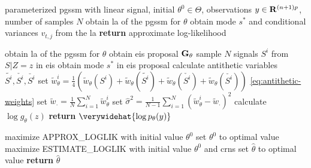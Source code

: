 \begin{algorithm}
    \begin{algorithmic}[1]
        \Require parameterized \gls{pgssm} with linear signal, initial $\theta^{0} \in \Theta$, observations $y \in \mathbf R^{(n+1)p}$, number of samples $N$
            \State obtain \gls{la} of the \gls{pgssm} for $\theta$ 
            \State obtain mode $s^{\ast}$ and conditional variances $v_{t,j}$ from the \gls{la} 
            \State \textbf{return} approximate log-likelihood 
        \EndFunction 
        \Statex

            \State obtain \gls{la} of the \gls{pgssm} for $\theta$ 
            \State obtain \gls{eis} proposal $\mathbf G_{\theta}$ 
            \State sample $N$ signals $S^{i}$ from $S|Z = z$ in \gls{eis} 
            \State obtain mode $s^{\ast}$ in \gls{eis} proposal 
            \State calculate antithetic variables $\tilde{S^{i}},\check{S^{i}}, \breve{{S^{i}}}$ \Comment{\eqref{eq:antithetic-location}, \eqref{eq:antithetic-scale} \& \eqref{eq:antithetic-scale-location}}
            \State set $\tilde w_{\theta}^i = \frac{1}{4} \left( \tilde w_{\theta} (S^{i}) + \tilde w_{\theta}(\tilde{S^{i}}) + \tilde w_{\theta}(\check{S^{i}}) + \tilde w_{\theta}(\breve{{S^{i}}}) \right)$ \eqref{eq:antithetic-weights}
            \State set $\tilde w_{\cdot} = \frac{1}{N}\sum_{i = 1}^N \tilde w^{i}_{\theta}$
            \State set $\hat \sigma^{2} = \frac{1}{N - 1} \sum_{i = 1}^N \left( \tilde w_{\theta}^{i} - \tilde w_{\cdot}\right)^{2}$
            \State calculate $\log g_{\theta}(z)$ 
            \State \textbf{return} $\verywidehat{\log p_{\theta}(y)}$ \Comment{\eqref{eq:loglik-hat-standard}}
        \EndFunction
        \Statex

        \State maximize \textrm{APPROX\_LOGLIK} with initial value $\theta^{0}$  
        \State set $\theta^{0} $ to optimal value
        \State maximize \textrm{ESTIMATE\_LOGLIK} with initial value $\theta^{0}$ and \glspl{crn}  
        \State set $\hat \theta$ to optimal value
        \State \textbf{return} $\hat \theta $
    \end{algorithmic}
    \caption{Maximum likelihood estimation in an \gls{pgssm} with linear signal using \gls{eis}.}
    \label{alg:mle}
\end{algorithm}

